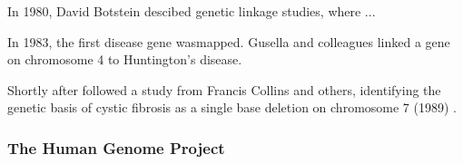 
In 1980, David Botstein descibed genetic linkage studies, where ... \cite{botstein1980construction}

In 1983, the first disease gene  wasmapped.
Gusella and colleagues linked a gene on chromosome 4 to Huntington's disease. \cite{gusella1983polymorphic}

Shortly after followed a study from Francis Collins and others, identifying the genetic basis of cystic fibrosis as a single base deletion on chromosome 7 (1989)  \cite{riordan1989identification}.





 





\subsubsection{The Human Genome Project}

